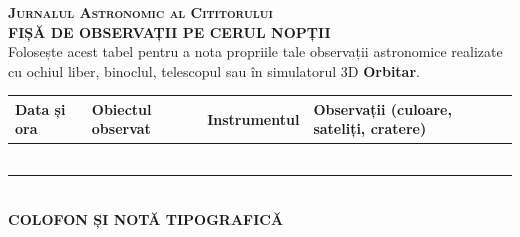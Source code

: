 \documentclass[11pt,a4paper,twoside,openany]{book}
\begin{document}
\clearpage
\thispagestyle{empty}
\vspace*{0.2cm}
\begin{center}
  {\color{orbitarCyanDark}\small\scshape\bfseries Jurnalul Astronomic al Cititorului}\\[0.15cm]
  {\color{orbitarDeepBlue}\Large\bfseries FIȘĂ DE OBSERVAȚII PE CERUL NOPȚII}\\[0.1cm]
  {\color{orbitarMuted}\footnotesize Folosește acest tabel pentru a nota propriile tale observații astronomice realizate cu ochiul liber, binoclul, telescopul sau în simulatorul 3D \textbf{Orbitar}.}
\end{center}
\vspace{0.15cm}

\begin{tcolorbox}[orbitardata, title={\textbf{Însemnări de teren și jurnal de bord}}]
\small
\renewcommand{\arraystretch}{1.85}
\begin{tabularx}{\textwidth}{@{}p{2.6cm}p{3.6cm}p{3.0cm}X@{}}
\toprule
\textbf{Data și ora} & \textbf{Obiectul observat} & \textbf{Instrumentul} & \textbf{Observații (culoare, sateliți, cratere)} \\
\midrule
\dotfill & \dotfill & \dotfill & \dotfill \\
\dotfill & \dotfill & \dotfill & \dotfill \\
\dotfill & \dotfill & \dotfill & \dotfill \\
\dotfill & \dotfill & \dotfill & \dotfill \\
\dotfill & \dotfill & \dotfill & \dotfill \\
\dotfill & \dotfill & \dotfill & \dotfill \\
\bottomrule
\end{tabularx}
\end{tcolorbox}

\vspace{0.35cm}
\begin{center}
  \\[0.25cm]
  {\color{orbitarDeepBlue}\large\bfseries COLOFON ȘI NOTĂ TIPOGRAFICĂ}
\end{center}
\vspace{0.1cm}
\end{document}
